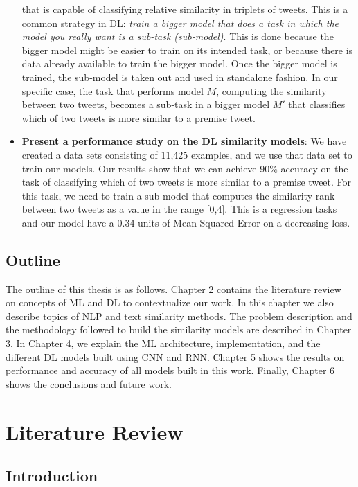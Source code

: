 \documentclass[12pt]{report}
\begin{document}
\begin{itemize}[nolistsep]
that is capable of classifying relative similarity in triplets of tweets. This is a common strategy in \ac{DL}: {\em train a bigger model that does a task in which the model you really want is  
	a sub-task (sub-model)}. This is done because the bigger model might be easier to train on its intended task, or because there is data already available to train the bigger model.  Once the bigger model is trained, the sub-model is taken out and used in standalone fashion. In our specific case, the task that performs model $M$, computing the similarity between two tweets, becomes a sub-task in a bigger
model $M'$ that classifies which of two tweets is more similar to a premise tweet.
		\item \textbf{Present a performance study on the DL similarity models}: We have created a data sets consisting of 11,425 examples, and we use that data set to train our models. Our results show that we can achieve 90\% accuracy on the task of classifying which of two tweets is more similar to a premise tweet.
		For this task, we need to train a sub-model that computes the similarity rank between two tweets as  a value in the range [0,4]. 
		This is a regression tasks and our model have a 0.34 units of Mean Squared Error on a decreasing loss.
	\end{itemize}
	
	\section{Outline}
	The outline of this thesis is as follows. Chapter 2 contains the literature review on concepts of \ac{ML} and \ac{DL} to contextualize our work. In this chapter we also describe topics of \ac{NLP} and text similarity methods. The problem description and the methodology followed to build the similarity models are described in Chapter 3. In Chapter 4, we explain the \ac{ML} architecture, implementation, and  the different \ac{DL} models built using \ac{CNN} and \ac{RNN}. Chapter 5 shows the results on performance and accuracy of all models built in this work. Finally, Chapter 6 shows the conclusions and future work.
	
	\onehalfspacing
	
	\chapter{Literature Review} \label{chapter 2}
	\section{Introduction}
	
\end{document}
